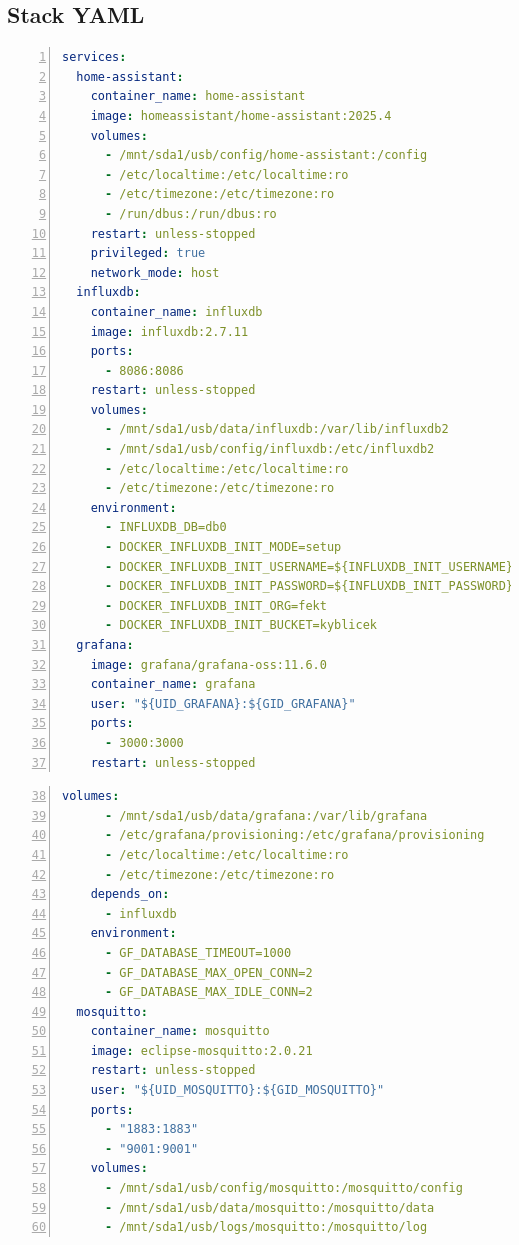 \subsection{Stack YAML}
\label{apend:stackyaml}
\begin{lstlisting}[language=YAML, breaklines=true, numbers=left, numberstyle=\small, numbersep=10pt, frame=single, basicstyle=\ttfamily\small, caption={Stack YAML}, label={lst:stackyaml}]
services:
  home-assistant:
    container_name: home-assistant
    image: homeassistant/home-assistant:2025.4
    volumes:
      - /mnt/sda1/usb/config/home-assistant:/config
      - /etc/localtime:/etc/localtime:ro
      - /etc/timezone:/etc/timezone:ro
      - /run/dbus:/run/dbus:ro
    restart: unless-stopped
    privileged: true
    network_mode: host
  influxdb:
    container_name: influxdb
    image: influxdb:2.7.11
    ports:
      - 8086:8086
    restart: unless-stopped
    volumes:
      - /mnt/sda1/usb/data/influxdb:/var/lib/influxdb2
      - /mnt/sda1/usb/config/influxdb:/etc/influxdb2
      - /etc/localtime:/etc/localtime:ro
      - /etc/timezone:/etc/timezone:ro
    environment:
      - INFLUXDB_DB=db0
      - DOCKER_INFLUXDB_INIT_MODE=setup
      - DOCKER_INFLUXDB_INIT_USERNAME=${INFLUXDB_INIT_USERNAME}
      - DOCKER_INFLUXDB_INIT_PASSWORD=${INFLUXDB_INIT_PASSWORD}
      - DOCKER_INFLUXDB_INIT_ORG=fekt
      - DOCKER_INFLUXDB_INIT_BUCKET=kyblicek
  grafana:
    image: grafana/grafana-oss:11.6.0
    container_name: grafana
    user: "${UID_GRAFANA}:${GID_GRAFANA}"
    ports:
      - 3000:3000
    restart: unless-stopped
\end{lstlisting}
\pagebreak
\begin{lstlisting}[language=YAML, breaklines=true, numbers=left, firstnumber=38, numberstyle=\small, numbersep=10pt, frame=single, basicstyle=\ttfamily\small]
    volumes:
      - /mnt/sda1/usb/data/grafana:/var/lib/grafana
      - /etc/grafana/provisioning:/etc/grafana/provisioning
      - /etc/localtime:/etc/localtime:ro
      - /etc/timezone:/etc/timezone:ro
    depends_on:
      - influxdb
    environment:
      - GF_DATABASE_TIMEOUT=1000
      - GF_DATABASE_MAX_OPEN_CONN=2
      - GF_DATABASE_MAX_IDLE_CONN=2
  mosquitto:
    container_name: mosquitto
    image: eclipse-mosquitto:2.0.21
    restart: unless-stopped
    user: "${UID_MOSQUITTO}:${GID_MOSQUITTO}"
    ports:
      - "1883:1883"
      - "9001:9001"
    volumes:
      - /mnt/sda1/usb/config/mosquitto:/mosquitto/config
      - /mnt/sda1/usb/data/mosquitto:/mosquitto/data
      - /mnt/sda1/usb/logs/mosquitto:/mosquitto/log
\end{lstlisting}
